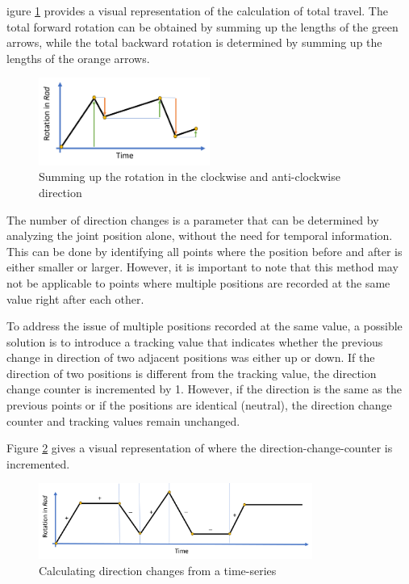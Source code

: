 igure \ref{travel} provides a visual representation of the calculation of total travel. The total forward rotation can be obtained by summing up the lengths of the green arrows, while the total backward rotation is determined by summing up the lengths of the orange arrows.

\begin{figure}[H]
	\centerline{\includegraphics[width=0.5\textwidth]{figures/travel.png}}
	\caption{Summing up the rotation in the clockwise and anti-clockwise direction }
	\label{travel}
\end{figure}

The number of direction changes is a parameter that can be determined by analyzing the joint position alone, without the need for temporal information. This can be done by identifying all points where the position before and after is either smaller or larger. However, it is important to note that this method may not be applicable to points where multiple positions are recorded at the same value right after each other.

To address the issue of multiple positions recorded at the same value, a possible solution is to introduce a tracking value that indicates whether the previous change in direction of two adjacent positions was either up or down. If the direction of two positions is different from the tracking value, the direction change counter is incremented by 1. However, if the direction is the same as the previous points or if the positions are identical (neutral), the direction change counter and tracking values remain unchanged.

Figure \ref{dirchange} gives a visual representation of where the direction-change-counter is incremented.

\begin{figure}[H]
	\centerline{\includegraphics[width=0.8\textwidth]{figures/dirchange.png}}
	\caption{Calculating direction changes from a time-series}
	\label{dirchange}
\end{figure}

